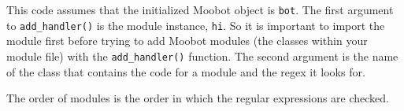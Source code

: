 \documentclass{article}[12pt]
\begin{document}
This code assumes that the initialized Moobot object is \texttt{bot}.  The
first argument to \texttt{add\_handler()} is the module instance, \texttt{hi}.
So it is important to import the module first before trying to add Moobot
modules (the classes within your module file) with the \texttt{add\_handler()}
function.  The second argument is the name of the class that contains the code
for a module and the regex it looks for.

The order of modules is the order in which the regular expressions are
checked.
\end{document}
